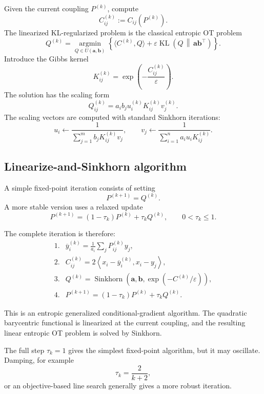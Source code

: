 \documentclass[11pt]{article}
\newcommand{\KL}{\operatorname{KL}}
\begin{document}
Given the current coupling \(P^{(k)}\), compute
\[
    C_{ij}^{(k)}
    :=
    C_{ij}(P^{(k)}).
\]
The linearized KL-regularized problem is the classical entropic OT problem
\[
    \boxed{
    Q^{(k)}
    =
    \operatorname*{argmin}_{Q\in U(\bm a,\bm b)}
    \left\{
        \langle C^{(k)},Q\rangle
        +
        \varepsilon
        \KL\left(Q\,\middle\|\,\bm a\bm b^\top\right)
    \right\}.
    }
\]
Introduce the Gibbs kernel
\[
    K_{ij}^{(k)}
    =
    \exp\left(
        -\frac{C_{ij}^{(k)}}{\varepsilon}
    \right).
\]
The solution has the scaling form
\[
    Q_{ij}^{(k)}
    =
    a_i b_j
    u_i^{(k)}K_{ij}^{(k)}v_j^{(k)}.
\]
The scaling vectors are computed with standard Sinkhorn iterations:
\[
    u_i
    \leftarrow
    \frac{1}{
        \sum_{j=1}^m b_jK_{ij}^{(k)}v_j
    },
    \qquad
    v_j
    \leftarrow
    \frac{1}{
        \sum_{i=1}^n a_i u_iK_{ij}^{(k)}
    }.
\]

\subsection{Linearize-and-Sinkhorn algorithm}

A simple fixed-point iteration consists of setting
\[
    P^{(k+1)}=Q^{(k)}.
\]
A more stable version uses a relaxed update
\[
    \boxed{
    P^{(k+1)}
    =
    (1-\tau_k)P^{(k)}
    +
    \tau_k Q^{(k)},
    \qquad 0<\tau_k\leq 1.
    }
\]

The complete iteration is therefore:
\[
\boxed{
\begin{array}{ll}
\text{1.} &
\displaystyle
\overline y_i^{(k)}
=
\frac1{a_i}\sum_jP_{ij}^{(k)}y_j,
\\[1.2em]
\text{2.} &
\displaystyle
C_{ij}^{(k)}
=
2\left\langle
x_i-\overline y_i^{(k)},x_i-y_j
\right\rangle,
\\[1.2em]
\text{3.} &
\displaystyle
Q^{(k)}
=
\operatorname{Sinkhorn}
\left(
\bm a,\bm b,
\exp(-C^{(k)}/\varepsilon)
\right),
\\[1.2em]
\text{4.} &
\displaystyle
P^{(k+1)}
=
(1-\tau_k)P^{(k)}
+
\tau_kQ^{(k)}.
\end{array}
}
\]

This is an entropic generalized conditional-gradient algorithm. The
quadratic barycentric functional is linearized at the current coupling,
and the resulting linear entropic OT problem is solved by Sinkhorn.

The full step \(\tau_k=1\) gives the simplest fixed-point algorithm, but it
may oscillate. Damping, for example
\[
    \tau_k=\frac{2}{k+2},
\]
or an objective-based line search generally gives a more robust iteration.
\end{document}
